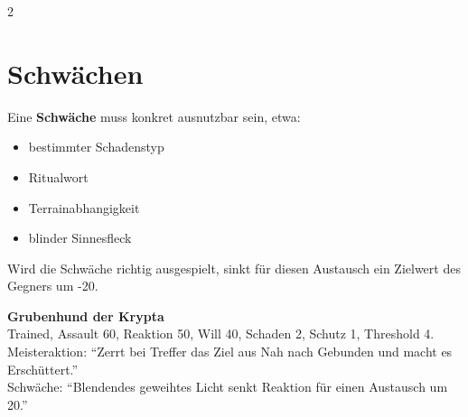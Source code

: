 \begin{multicols*}{2}
\section{Schwächen}
Eine \textbf{Schwäche} muss konkret ausnutzbar sein, etwa:
\begin{itemize}[leftmargin=*]
\item bestimmter Schadenstyp
\item Ritualwort
\item Terrainabhangigkeit
\item blinder Sinnesfleck
\end{itemize}

Wird die Schwäche richtig ausgespielt, sinkt für diesen Austausch ein Zielwert des Gegners um -20.

\begin{ruleexample}
\textbf{Grubenhund der Krypta}\\
Trained, Assault 60, Reaktion 50, Will 40, Schaden 2, Schutz 1, Threshold 4.\\
Meisteraktion: ``Zerrt bei Treffer das Ziel aus Nah nach Gebunden und macht es Erschüttert.''\\
Schwäche: ``Blendendes geweihtes Licht senkt Reaktion für einen Austausch um 20.''
\end{ruleexample}
\end{multicols*}
